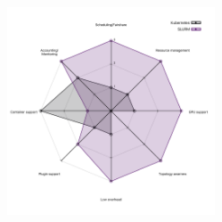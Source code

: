 \documentclass[hyperref={pdfpagelabels=false},aspectratio=169]{beamer}
\begin{document}
    \begin{frame}
      \begin{figure}[H]
      \centering
      \includegraphics[width=0.55\textwidth]{images/kuber.pdf}
      \label{fig:kube_vs_slurm}
    \end{figure}
    \end{frame}
    
\end{document}
